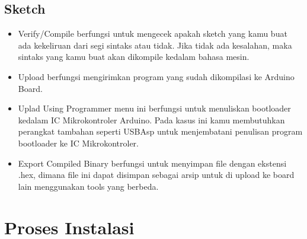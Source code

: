 \begin{itemize}
\subsection{Sketch}
\begin{itemize}
\item Verify/Compile berfungsi untuk mengecek apakah sketch yang kamu buat ada kekeliruan dari segi sintaks atau tidak. Jika tidak  ada kesalahan, maka sintaks yang kamu buat akan dikompile kedalam bahasa mesin.
\item Upload berfungsi mengirimkan program yang sudah dikompilasi ke Arduino Board.
\item Uplad Using Programmer menu ini berfungsi untuk menuliskan bootloader kedalam IC Mikrokontroler Arduino. Pada kasus ini kamu membutuhkan perangkat tambahan seperti USBAsp untuk menjembatani penulisan program bootloader ke IC Mikrokontroler.
\item Export Compiled Binary berfungsi untuk menyimpan file dengan ekstensi .hex, dimana file ini dapat disimpan sebagai arsip untuk di upload ke board lain menggunakan tools yang berbeda.
\end{itemize}




\section{Proses Instalasi}


\end{itemize}
